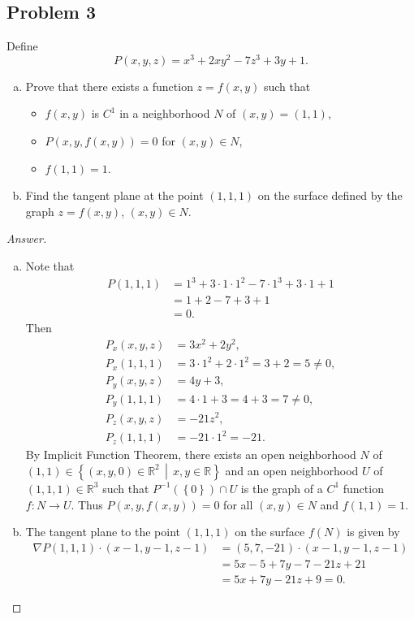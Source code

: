 \documentclass[12pt]{article}
\newcommand{\real}{\mathbb{R}}
\newcommand\inv[1]{#1^{-1}}
\newcommand\paren[1]{\left( #1 \right)}
\newcommand\setb[1]{\left \{ #1 \right \}}
\theoremstyle{definition}
\begin{document}
\subsection{Problem 3}
Define 
\[
    P(x,y,z) = x^3 + 2xy^2 - 7z^3 + 3y + 1.
\]
\begin{enumerate}[(a)]
    \item Prove that there exists a function $z = f(x,y)$ such that 
    \begin{itemize}
        \item $f(x,y)$ is $C^1$ in a neighborhood $N$ of $(x,y) = (1,1)$,
        \item $P(x,y,f(x,y)) = 0$ for $(x,y) \in N$,
        \item $f(1,1) = 1$.
    \end{itemize}
    \item Find the tangent plane at the point $(1,1,1)$ on the surface defined by the graph $z = f(x,y)$, $(x,y) \in N$.
\end{enumerate}
\begin{proof}[Answer]
    \noindent
    \begin{enumerate}[(a)]
        \item Note that
        \begin{align*}
            P(1,1,1) & = 1^3 + 3 \cdot 1 \cdot 1^2 - 7 \cdot 1^3 + 3 \cdot 1 + 1 \\
            & = 1 + 2 - 7 + 3 + 1 \\
            & = 0.
        \end{align*}
        Then
        \begin{align*}
            P_x(x,y,z) & = 3x^2 + 2y^2, \\
            P_x(1,1,1) & = 3 \cdot 1^2 + 2 \cdot 1^2 = 3 + 2 = 5 \neq 0, \\
            P_y(x,y,z) & = 4y + 3, \\
            P_y(1,1,1) & = 4\cdot1 + 3 = 4 + 3 = 7 \neq 0, \\
            P_z(x,y,z) & = -21z^2, \\
            P_z(1,1,1) & = -21\cdot1^2 = -21.
        \end{align*}
        By Implicit Function Theorem, there exists an open neighborhood $N$ of $(1,1) \in \setb{ (x,y,0) \in \real^2 \, \middle| \, x,y \in \real}$ and an open neighborhood $U$ of $(1,1,1) \in \real^3$ such that $\inv{P} \paren{ \setb{ 0 } } \cap U$ is the graph of a $C^1$ function $f : N \to U$. Thus $P(x,y,f(x,y)) = 0$ for all $(x,y) \in N$ and $f(1,1) = 1$. 
        \item The tangent plane to the point $(1,1,1)$ on the surface $f(N)$ is given by 
        \begin{align*}
            \nabla P(1,1,1) \cdot (x-1,y-1,z-1) & = (5,7,-21) \cdot (x-1,y-1,z-1) \\
            & = 5x - 5 + 7y - 7 -21z + 21 \\
            & = 5x + 7y - 21z + 9 = 0.
        \end{align*}
    \end{enumerate}
\end{proof}
\end{document}
